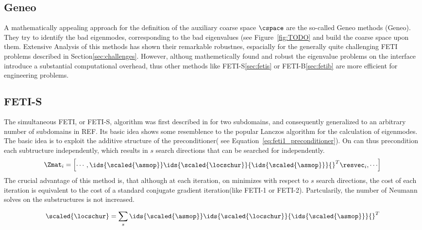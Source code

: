 \documentclass[preview]{standalone} %
\begin{document}
\subsection{Geneo}
A mathematically appealing approach for the definition of the auxiliary coarse space $\cspace$ are the so-called Geneo methods (Geneo). They try to identify the bad eigenmodes, corresponding to the bad eigenvalues (see Figure~\ref{fig:TODO} and build the coarse space upon them. Extensive Analysis of this methods\cite{Spillane2016,Spillane2013,Spillane2014} has shown their remarkable robustnes, espacially for the generally quite challenging FETI problems described in Section\ref{sec:challenges}. However, althoug mathemetically found and robust the eigenvalue problems on the interface introduce a substantial computational overhead, thus other methods like FETI-S\ref{sec:fetis} or FETI-B\ref{sec:fetib} are more efficient for engineering problems.

\subsection{FETI-S}

The simultaneous FETI, or FETI-S, algorithm was first described in \cite{RixenPhD} for two subdomains, and consequently generalized to an arbitrary number of subdomains in REF. Its basic idea shows some resemblence to the popular Lanczos algorithm for the calculation of eigenmodes.\\
The basic idea is to exploit the additive structure of the preconditioner( see Equation~\eqref{eq:feti1_preconditioner}).
On can thus precondition each subtructure independently, which results in $s$ search directions that can be searched for independently.
\begin{align}
\Zmat_i=\begin{bmatrix} \cdots,\ids{\scaled{\asmop}} \ids{\scaled{\locschur}} {\ids{\scaled{\asmop}}}{}^T \resvec_i,\cdots \end{bmatrix}     
\end{align}
The crucial advantage of this method is, that although at each iteration, on minimizes with respect to $s$ search directions, the cost of each iteration is equivalent to the cost of a standard conjugate gradient iteration(like FETI-1 or FETI-2). Partcularily, the number of Neumann solves on the substructures is not increased.

\begin{align}
\scaled{\locschur}=\sum_s \ids{{\scaled{\asmop}}} \ids{{\scaled{\locschur}}}
{\ids{{\scaled{\asmop}}}}{}^T  \\
\end{align}
\end{document}
